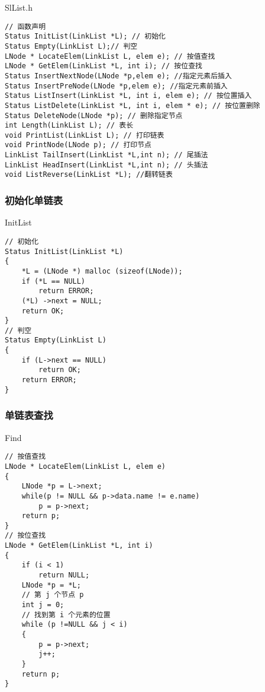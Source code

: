 \begin{macbox}{SlList.h}
    \begin{verbatim}
// 函数声明 
Status InitList(LinkList *L); // 初始化
Status Empty(LinkList L);// 判空
LNode * LocateElem(LinkList L, elem e); // 按值查找
LNode * GetElem(LinkList *L, int i); // 按位查找
Status InsertNextNode(LNode *p,elem e); //指定元素后插入
Status InsertPreNode(LNode *p,elem e); //指定元素前插入
Status ListInsert(LinkList *L, int i, elem e); // 按位置插入
Status ListDelete(LinkList *L, int i, elem * e); // 按位置删除
Status DeleteNode(LNode *p); // 删除指定节点
int Length(LinkList L); // 表长
void PrintList(LinkList L); // 打印链表
void PrintNode(LNode p); // 打印节点
LinkList TailInsert(LinkList *L,int n); // 尾插法
LinkList HeadInsert(LinkList *L,int n); // 头插法
void ListReverse(LinkList *L); //翻转链表
    \end{verbatim}
\end{macbox}

\subsubsection{初始化单链表}
\begin{macbox}{InitList}
	\begin{verbatim}
// 初始化
Status InitList(LinkList *L)
{
    *L = (LNode *) malloc (sizeof(LNode));
    if (*L == NULL)
        return ERROR;
    (*L) ->next = NULL;
    return OK;
}
// 判空
Status Empty(LinkList L)
{
    if (L->next == NULL)
        return OK;
    return ERROR;
}
    \end{verbatim}
\end{macbox}

\subsubsection{单链表查找}
\begin{macbox}{Find}
	\begin{verbatim}
// 按值查找
LNode * LocateElem(LinkList L, elem e)
{
    LNode *p = L->next;
    while(p != NULL && p->data.name != e.name)
        p = p->next;
    return p;
}
// 按位查找 
LNode * GetElem(LinkList *L, int i)
{
    if (i < 1)
        return NULL;
    LNode *p = *L;
    // 第 j 个节点 p
    int j = 0;
    // 找到第 i 个元素的位置
    while (p !=NULL && j < i)
    {
        p = p->next;
        j++;
    }
    return p;
}
    \end{verbatim}
\end{macbox}
